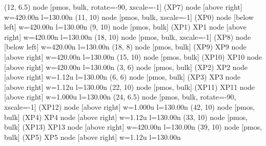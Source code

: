 \begin{circuitikz}[american]
	(12, 6.5) node [pmos, bulk, rotate=-90, xscale=-1] (XP7) {} node [above right] {\tiny {w=420.00n l=130.00n}}
	(11, 10) node [pmos, bulk, xscale=-1] (XP0) {} node [below left] {\tiny {w=420.00n l=130.00n}}
	(9, 10) node [pmos, bulk] (XP1) {XP1} node [above right] {\tiny {w=420.00n l=130.00n}}
	(18, 10) node [pmos, bulk, xscale=-1] (XP8) {} node [below left] {\tiny {w=420.00n l=130.00n}}
	(18, 8) node [pmos, bulk] (XP9) {XP9} node [above right] {\tiny {w=420.00n l=130.00n}}
	(15, 10) node [pmos, bulk] (XP10) {XP10} node [above right] {\tiny {w=420.00n l=130.00n}}
	(3, 6) node [pmos, bulk] (XP2) {XP2} node [above right] {\tiny {w=1.12u l=130.00n}}
	(6, 6) node [pmos, bulk] (XP3) {XP3} node [above right] {\tiny {w=1.12u l=130.00n}}
	(22, 10) node [pmos, bulk] (XP11) {XP11} node [above right] {\tiny {w=1.000u l=130.00n}}
	(24, 6.5) node [pmos, bulk, rotate=-90, xscale=-1] (XP12) {} node [above right] {\tiny {w=1.000u l=130.00n}}
	(42, 10) node [pmos, bulk] (XP4) {XP4} node [above right] {\tiny {w=1.12u l=130.00n}}
	(33, 10) node [pmos, bulk] (XP13) {XP13} node [above right] {\tiny {w=420.00n l=130.00n}}
	(39, 10) node [pmos, bulk] (XP5) {XP5} node [above right] {\tiny {w=1.12u l=130.00n}}



\end{circuitikz}
